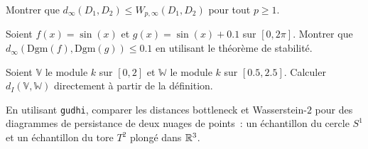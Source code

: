 \begin{exercice}
Montrer que $d_\infty(D_1, D_2) \leq W_{p,\infty}(D_1, D_2)$
pour tout $p \geq 1$.
\end{exercice}

\begin{exercice}
Soient $f(x) = \sin(x)$ et $g(x) = \sin(x) + 0.1$ sur $[0, 2\pi]$.
Montrer que $d_\infty(\mathrm{Dgm}(f), \mathrm{Dgm}(g)) \leq 0.1$
en utilisant le th\'eor\`eme de stabilit\'e.
\end{exercice}

\begin{exercice}
Soient $\mathbb{V}$ le module $k$ sur $[0, 2]$ et $\mathbb{W}$ le
module $k$ sur $[0.5, 2.5]$. Calculer $d_I(\mathbb{V}, \mathbb{W})$
directement \`a partir de la d\'efinition.
\end{exercice}

\begin{exercice}
En utilisant \texttt{gudhi}, comparer les distances bottleneck et
Wasserstein-$2$ pour des diagrammes de persistance de deux nuages
de points~: un \'echantillon du cercle $S^1$ et un \'echantillon
du tore $T^2$ plong\'e dans $\mathbb{R}^3$.
\end{exercice}
